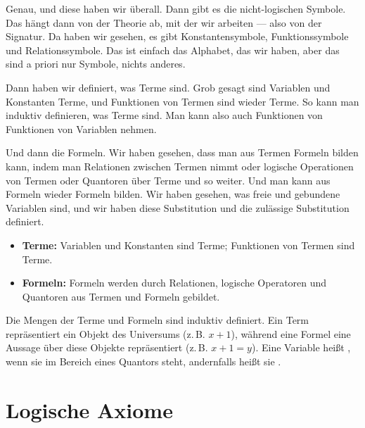 \begin{spoken-clean}[00:02:15 - 00:04:30]
Genau, und diese haben wir überall. Dann gibt es die nicht-logischen Symbole. Das hängt dann von der Theorie ab, mit der wir arbeiten --- also von der Signatur. Da haben wir gesehen, es gibt Konstantensymbole, Funktionssymbole und Relationssymbole. Das ist einfach das Alphabet, das wir haben, aber das sind a priori nur Symbole, nichts anderes.

Dann haben wir definiert, was Terme sind. Grob gesagt sind Variablen und Konstanten Terme, und Funktionen von Termen sind wieder Terme. So kann man induktiv definieren, was Terme sind. Man kann also auch Funktionen von Funktionen von Variablen nehmen.

Und dann die Formeln. Wir haben gesehen, dass man aus Termen Formeln bilden kann, indem man Relationen zwischen Termen nimmt oder logische Operationen von Termen oder Quantoren über Terme und so weiter. Und man kann aus Formeln wieder Formeln bilden. Wir haben gesehen, was freie und gebundene Variablen sind, und wir haben diese Substitution und die zulässige Substitution definiert.
\end{spoken-clean}

\begin{math-stroke}
\begin{itemize}
    \item \textbf{Terme:} Variablen und Konstanten sind Terme; Funktionen von Termen sind Terme.
    \item \textbf{Formeln:} Formeln werden durch Relationen, logische Operatoren und Quantoren aus Termen und Formeln gebildet.
\end{itemize}

\begin{explanation-of-steps}
Die Mengen der Terme und Formeln sind induktiv definiert. Ein Term repräsentiert ein Objekt des Universums (z.\,B. $x+1$), während eine Formel eine Aussage über diese Objekte repräsentiert (z.\,B. $x+1 = y$). Eine Variable heißt , wenn sie im Bereich eines Quantors steht, andernfalls heißt sie .
\end{explanation-of-steps}
\end{math-stroke}

\section{Logische Axiome}

